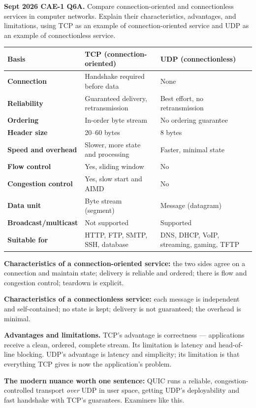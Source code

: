 \documentclass[11pt,a4paper]{article}
\begin{document}
\begin{pyqbox}
\textbf{Sept 2026 CAE-1 Q6A.} Compare connection-oriented and connectionless services in computer networks. Explain their characteristics, advantages, and limitations, using TCP as an example of connection-oriented service and UDP as an example of connectionless service.
\end{pyqbox}

\begin{solbox}
\begin{center}\small
\begin{tabularx}{\textwidth}{>{\bfseries}p{} X X}
\toprule Basis & TCP (connection-oriented) & UDP (connectionless)\\
\midrule
Connection & Handshake required before data & None\\
Reliability & Guaranteed delivery, retransmission & Best effort, no retransmission\\
Ordering & In-order byte stream & No ordering guarantee\\
Header size & 20--60 bytes & 8 bytes\\
Speed and overhead & Slower, more state and processing & Faster, minimal state\\
Flow control & Yes, sliding window & No\\
Congestion control & Yes, slow start and AIMD & No\\
Data unit & Byte stream (segment) & Message (datagram)\\
Broadcast/multicast & Not supported & Supported\\
Suitable for & HTTP, FTP, SMTP, SSH, database & DNS, DHCP, VoIP, streaming, gaming, TFTP\\
\bottomrule
\end{tabularx}
\end{center}

\textbf{Characteristics of a connection-oriented service:} the two sides agree on a connection and maintain state; delivery is reliable and ordered; there is flow and congestion control; teardown is explicit.

\textbf{Characteristics of a connectionless service:} each message is independent and self-contained; no state is kept; delivery is not guaranteed; the overhead is minimal.

\textbf{Advantages and limitations.} TCP's advantage is correctness --- applications receive a clean, ordered, complete stream. Its limitation is latency and head-of-line blocking. UDP's advantage is latency and simplicity; its limitation is that everything TCP gives is now the application's problem.

\textbf{The modern nuance worth one sentence:} QUIC runs a reliable, congestion-controlled transport \emph{over} UDP in user space, getting UDP's deployability and fast handshake with TCP's guarantees. Examiners like this.
\end{solbox}
\end{document}
